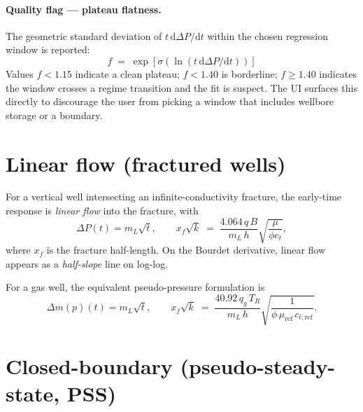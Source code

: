 \documentclass[11pt,a4paper]{article}
\newcommand{\D}{\mathrm{d}}
\newcommand{\mpres}{m(p)}
\begin{document}
\paragraph{Quality flag — plateau flatness.}
The geometric standard deviation of $t\,\D\Delta P/\D t$ within the
chosen regression window is reported:
\begin{equation}
    f \;=\; \exp\!\left[\sigma\!\left(\ln(t\,\D\Delta P/\D t)\right)\right]
\end{equation}
Values $f<1.15$ indicate a clean plateau; $f<1.40$ is borderline;
$f\geq 1.40$ indicates the window crosses a regime transition and the
fit is suspect. The UI surfaces this directly to discourage the user
from picking a window that includes wellbore storage or a boundary.

\section{Linear flow (fractured wells)}
\label{sec:linear}

For a vertical well intersecting an infinite-conductivity fracture, the
early-time response is \emph{linear flow} into the fracture, with
\begin{equation}
    \Delta P(t) = m_L \sqrt{t},
    \qquad
    x_f\sqrt{k} \;=\; \frac{4.064\,q\,B}{m_L\,h}\sqrt{\frac{\mu}{\phi c_t}},
\end{equation}
where $x_f$ is the fracture half-length. On the Bourdet derivative,
linear flow appears as a \emph{half-slope} line on log-log.

For a gas well, the equivalent pseudo-pressure formulation is
\begin{equation}
    \Delta \mpres(t) = m_L \sqrt{t},
    \qquad
    x_f\sqrt{k} \;=\; \frac{40.92\,q_g\,T_R}{m_L\,h}\sqrt{\frac{1}{\phi\,\mu_\text{ref}\,c_{t,\text{ref}}}}.
\end{equation}

\section{Closed-boundary (pseudo-steady-state, PSS)}
\label{sec:pss}
\end{document}
